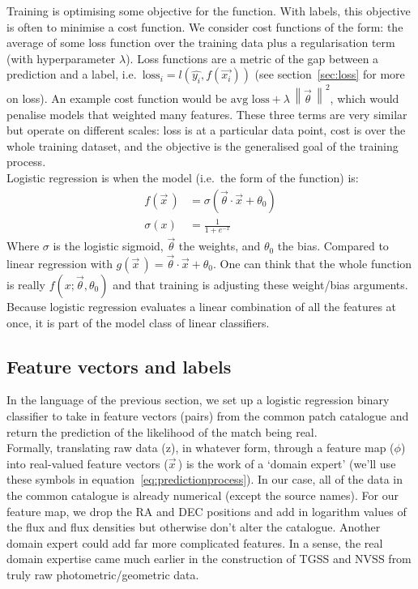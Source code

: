 \documentclass[12pt,a4paper]{article}
\newcommand{\norm}[1]{\left\lVert#1\right\rVert}
\begin{document}
Training is optimising some objective for the function. With labels, this objective is often to minimise a cost function. We consider cost functions of the form: the average of some loss function over the training data plus a regularisation term (with hyperparameter $\lambda$). Loss functions are a metric of the gap between a prediction and a label, i.e.\ $\text{loss}_i = l(\hat{y_i},f(\vec{x_i}))$ (see section~\ref{sec:loss} for more on loss). An example cost function would be $\text{avg loss} + \lambda\,\norm{\vec{\theta}\,}^2$, which would penalise models that weighted many features. These three terms are very similar but operate on different scales: loss is at a particular data point, cost is over the whole training dataset, and the objective is the generalised goal of the training process.\\

Logistic regression is when the model (i.e.\ the form of the function) is:
\begin{equation}
\begin{split}
    f(\vec{x}\,) &= \sigma(\vec{\theta}\cdot\vec{x}+\theta_0) \\
    \sigma(x) &= \frac{1}{1+e^{-x}}       
\end{split}
\end{equation}
Where $\sigma$ is the logistic sigmoid, $\vec{\theta}$ the weights, and $\theta_0$ the bias. Compared to linear regression with $g(\vec{x}\,) = \vec{\theta}\cdot\vec{x}+\theta_0$. One can think that the whole function is really $f(x;\vec{\theta},\theta_0)$ and that training is adjusting these weight/bias arguments. Because logistic regression evaluates a linear combination of all the features at once, it is part of the model class of linear classifiers.

\subsection{Feature vectors and labels}
In the language of the previous section, we set up a logistic regression binary classifier to take in feature vectors (pairs) from the common patch catalogue and return the prediction of the likelihood of the match being real.\\

Formally, translating raw data (z), in whatever form, through a feature map ($\phi$) into real-valued feature vectors ($\vec{x}$\,) is the work of a `domain expert' (we'll use these symbols in equation~\ref{eq:predictionprocess}). In our case, all of the data in the common catalogue is already numerical (except the source names). For our feature map, we drop the RA and DEC positions and add in logarithm values of the flux and flux densities but otherwise don't alter the catalogue. Another domain expert could add far more complicated features. In a sense, the real domain expertise came much earlier in the construction of TGSS and NVSS from truly raw photometric/geometric data.\\
\end{document}
